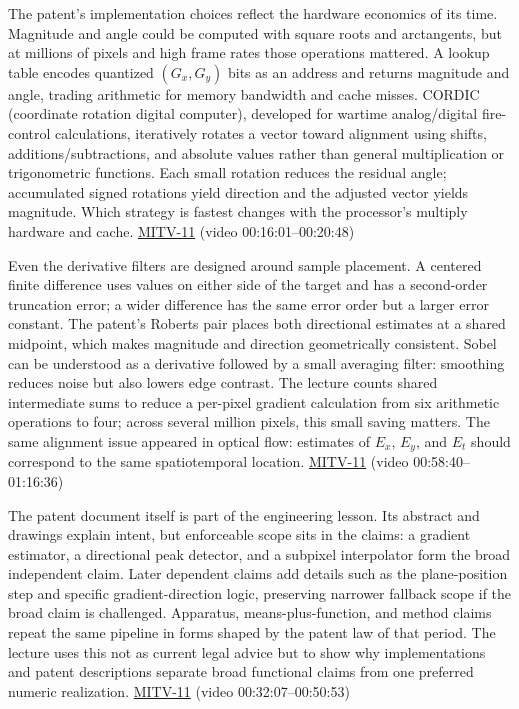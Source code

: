 The patent's implementation choices reflect the hardware economics of its time. Magnitude and angle could be computed with square roots and arctangents, but at millions of pixels and high frame rates those operations mattered. A lookup table encodes quantized \((G_x,G_y)\) bits as an address and returns magnitude and angle, trading arithmetic for memory bandwidth and cache misses. CORDIC (coordinate rotation digital computer), developed for wartime analog/digital fire-control calculations, iteratively rotates a vector toward alignment using shifts, additions/subtractions, and absolute values rather than general multiplication or trigonometric functions. Each small rotation reduces the residual angle; accumulated signed rotations yield direction and the adjusted vector yields magnitude. Which strategy is fastest changes with the processor's multiply hardware and cache. \hyperref[04-visual-computing-ii-ch036-mitv-11---edge-detection-subpixel-position-cordic-line-detection-us-6408109]{MITV-11} (video 00:16:01--00:20:48)

Even the derivative filters are designed around sample placement. A centered finite difference uses values on either side of the target and has a second-order truncation error; a wider difference has the same error order but a larger error constant. The patent's Roberts pair places both directional estimates at a shared midpoint, which makes magnitude and direction geometrically consistent. Sobel can be understood as a derivative followed by a small averaging filter: smoothing reduces noise but also lowers edge contrast. The lecture counts shared intermediate sums to reduce a per-pixel gradient calculation from six arithmetic operations to four; across several million pixels, this small saving matters. The same alignment issue appeared in optical flow: estimates of \(E_x\), \(E_y\), and \(E_t\) should correspond to the same spatiotemporal location. \hyperref[04-visual-computing-ii-ch036-mitv-11---edge-detection-subpixel-position-cordic-line-detection-us-6408109]{MITV-11} (video 00:58:40--01:16:36)

The patent document itself is part of the engineering lesson. Its abstract and drawings explain intent, but enforceable scope sits in the claims: a gradient estimator, a directional peak detector, and a subpixel interpolator form the broad independent claim. Later dependent claims add details such as the plane-position step and specific gradient-direction logic, preserving narrower fallback scope if the broad claim is challenged. Apparatus, means-plus-function, and method claims repeat the same pipeline in forms shaped by the patent law of that period. The lecture uses this not as current legal advice but to show why implementations and patent descriptions separate broad functional claims from one preferred numeric realization. \hyperref[04-visual-computing-ii-ch036-mitv-11---edge-detection-subpixel-position-cordic-line-detection-us-6408109]{MITV-11} (video 00:32:07--00:50:53)

